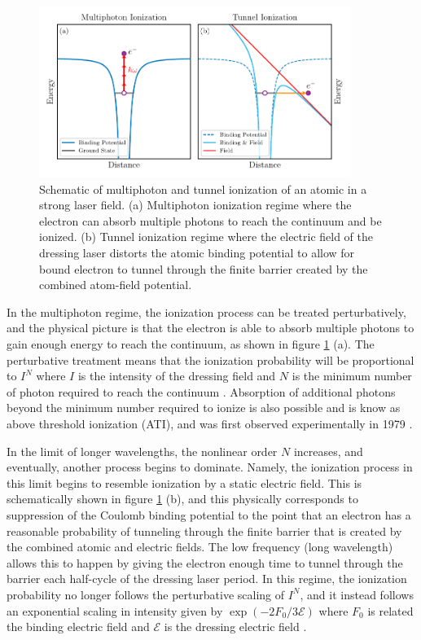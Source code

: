 \begin{figure}
	\centering
	\includegraphics[width=0.9\textwidth]{figures/ATS/MPI_Tunneling.pdf}
	\caption[Schematic of multiphoton and tunnel ionization]{Schematic of multiphoton and tunnel ionization of an atomic in a strong laser field. (a) Multiphoton ionization regime where the electron can absorb multiple photons to reach the continuum and be ionized.  (b) Tunnel ionization regime where the electric field of the dressing laser distorts the atomic binding potential to allow for  bound electron to tunnel through the finite barrier created by the combined atom-field potential.}
	\label{fig:mpi_tunnel}
\end{figure}

In the multiphoton regime, the ionization process can be treated perturbatively, and the physical picture is that the electron is able to absorb multiple photons to gain enough energy to reach the continuum, as shown in figure \ref{fig:mpi_tunnel} (a).  The perturbative treatment means that the ionization probability will be proportional to $I^N$ where $I$ is the intensity of the dressing field and $N$ is the minimum number of photon required to reach the continuum \cite{boydNonlinearOptics2008}.  Absorption of additional photons beyond the minimum number required to ionize is also possible and is know as above threshold ionization (ATI), and was first observed experimentally in 1979 \cite{agostiniFreeFreeTransitionsFollowing1979a}.

In the limit of longer wavelengths, the nonlinear order $N$ increases, and eventually, another process begins to dominate.  Namely, the ionization process in this limit begins to resemble ionization by a static electric field.  This is schematically shown in figure \ref{fig:mpi_tunnel} (b), and this physically corresponds to suppression of the Coulomb binding potential to the point that an electron has a reasonable probability of tunneling through the finite barrier that is created by the combined atomic and electric fields. The low frequency (long wavelength) allows this to happen by giving the electron enough time to tunnel through the barrier each half-cycle of the dressing laser period.  In this regime, the ionization probability no longer follows the perturbative scaling of $I^N$, and it instead follows an exponential scaling in intensity given by $\exp(-2F_0/3\mathcal{E})$ where $F_0$ is related the binding electric field and $\mathcal{E}$ is the dressing electric field \cite{keldyshIonizationFieldStrong1965,changFundamentalsAttosecondOptics2011}. 

